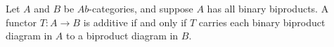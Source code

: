 Let $A$ and $B$ be $\textit{Ab}$-categories, and suppose $A$ has all binary biproducts. A functor $T : A \to B$ is additive if and only if $T$ carries each binary biproduct diagram in $A$ to a biproduct diagram in $B$.
